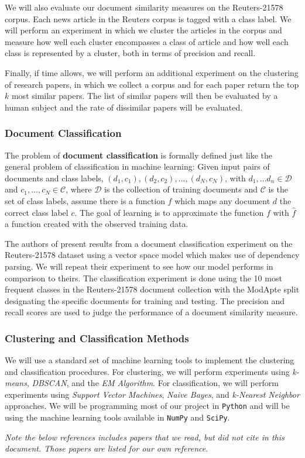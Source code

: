 \documentclass[11pt]{article}
\begin{document}
We will also evaluate our document similarity measures on the Reuters-21578 corpus. Each news article in the Reuters corpus is tagged with a class label. We will perform an experiment in which we cluster the articles in the corpus and measure how well each cluster encompasses a class of article and how well each class is represented by a cluster, both in terms of precision and recall. 

Finally, if time allows, we will perform an additional experiment on the clustering of research papers, in which we collect a corpus and for each paper return the top $k$ most similar papers. The list of similar papers will then be evaluated by a human subject and the rate of dissimilar papers will be evaluated. 

\subsubsection{Document Classification} \label{sec:DocumentClassification}

The problem of \textbf{document classification} is formally defined just like the general problem of classification in machine learning: Given input pairs of documents and class labels, $(d_1, c_1), (d_2, c_2), \dots, (d_N, c_N)$, with $d_1, \dots d_n \in \mathcal{D}$ and $c_1, \dots, c_N \in \mathcal{C}$, where  $\mathcal{D}$ is the collection of training documents and $\mathcal{C}$ is the set of class labels, assume there is a function $f$ which maps any document $d$ the correct class label $c$. The goal of learning is to approximate the function $f$ with $\hat{f}$ a function created with the observed training data. 

The authors of \cite{Nastase2007} present results from a document classification experiment on the Reuters-21578 dataset using a vector space model which makes use of dependency parsing. We will repeat their experiment to see how our model performs in comparison to theirs. The classification experiment is done using the 10 most frequent classes in the Reuters-21578 document collection with the ModApte split designating the specific documents for training and testing. The precision and recall scores are used to judge the performance of a document similarity measure. 

\subsubsection{Clustering and Classification Methods}

We will use a standard set of machine learning tools to implement the clustering and classification procedures. For clustering, we will perform experiments using \emph{k-means}, \emph{DBSCAN}, and the \emph{EM Algorithm}. For classification, we will perform experiments using \emph{Support Vector Machines}, \emph{Naive Bayes}, and \emph{k-Nearest Neighbor} approaches. We will be programming most of our project in {\tt Python} and will be using the machine learning tools available in {\tt NumPy} and {\tt SciPy}.

\bigskip
\bigskip

\emph{Note the below references includes papers that we read, but did not cite in this document. Those papers are listed for our own reference}.


\nocite{*}



  
  
\end{document}
